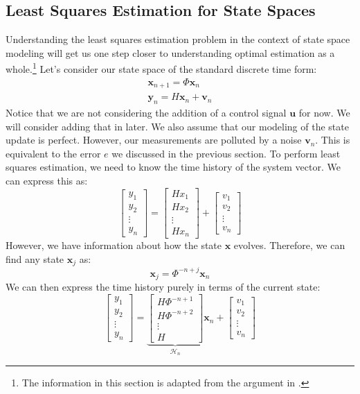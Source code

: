 \subsection{Least Squares Estimation for State Spaces}
Understanding the least squares estimation problem in the context of state space modeling will get us one step closer to understanding optimal estimation as a whole.\footnote{The information in this section is adapted from the argument in \cite{kamen_introduction_1999}.} Let's consider our state space of the standard discrete time form:
\begin{gather}
\bm{x}_{n+1}=\Phi \bm{x}_n\\
\bm{y}_n=H\bm{x}_n+\bm{v}_n
\end{gather}
Notice that we are not considering the addition of a control signal $\bm{u}$ for now. We will consider adding that in later. We also assume that our modeling of the state update is perfect. However, our measurements are polluted by a noise $\bm{v}_n$. This is equivalent to the error $e$ we discussed in the previous section. To perform least squares estimation, we need to know the time history of the system vector. We can express this as:
$$\begin{bmatrix}
    y_1\\y_2\\\vdots\\y_n
\end{bmatrix}=\begin{bmatrix}
    Hx_1\\Hx_2\\\vdots\\Hx_n
\end{bmatrix}+\begin{bmatrix}
    v_1\\v_2\\\vdots\\v_n
\end{bmatrix}$$
However, we have information about how the state $\bm{x}$ evolves. Therefore, we can find any state $\bm{x}_j$ as:
$$\bm{x}_j=\Phi^{-n+j}\bm{x}_n$$
We can then express the time history purely in terms of the current state:
$$\begin{bmatrix}
    y_1\\y_2\\\vdots\\y_n
\end{bmatrix}=\underbrace{\begin{bmatrix}
    H\Phi^{-n+1}\\H\Phi^{-n+2}\\\vdots\\H
\end{bmatrix}}_{\mathcal{H}_n}\bm{x}_n+\begin{bmatrix}
    v_1\\v_2\\\vdots\\v_n
\end{bmatrix}$$

